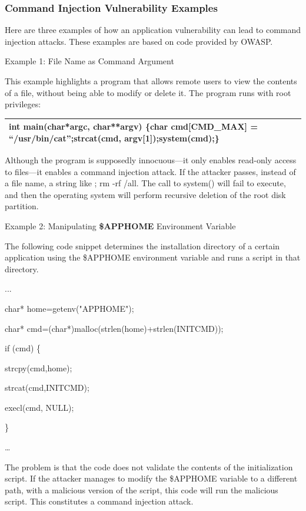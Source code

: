 \subsubsection{Command Injection Vulnerability Examples}

Here are three examples of how an application vulnerability can lead to command injection attacks. These examples are based on code provided by OWASP.

Example 1: File Name as Command Argument

This example highlights a program that allows remote users to view the contents of a file, without being able to modify or delete it. The program runs with root privileges:

\begin{table}
\centering

\begin{tabular}{| l |}
\hline
int main(char*argc, char**argv) \{char cmd[CMD\_MAX] = “/usr/bin/cat”;strcat(cmd, argv[1]);system(cmd);\} \\
\hline

\end{tabular}

\end{table}

Although the program is supposedly innocuous—it only enables read-only access to files—it enables a command injection attack. If the attacker passes, instead of a file name, a string like ; rm -rf /all. The call to system() will fail to execute, and then the operating system will perform recursive deletion of the root disk partition.

Example 2: Manipulating \textbf{\$APPHOME }Environment Variable

The following code snippet determines the installation directory of a certain application using the \$APPHOME environment variable and runs a script in that directory.

...

char* home=getenv("APPHOME");

char* cmd=(char*)malloc(strlen(home)+strlen(INITCMD));

if (cmd) \{

strcpy(cmd,home);

strcat(cmd,INITCMD);

execl(cmd, NULL);

\}

…

The problem is that the code does not validate the contents of the initialization script. If the attacker manages to modify the \$APPHOME variable to a different path, with a malicious version of the script, this code will run the malicious script. This constitutes a command injection attack.

